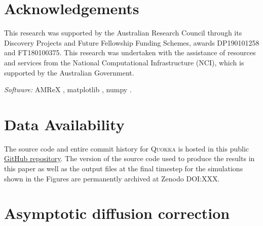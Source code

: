 \documentclass[fleqn,usenatbib]{mnras}
\begin{document}
\section*{Acknowledgements}

This research was supported by the Australian Research Council through its Discovery Projects and Future Fellowship Funding Schemes, awards DP190101258 and FT180100375. This research was undertaken with the assistance of resources and services from the National Computational Infrastructure (NCI), which is supported by the Australian Government.

\emph{Software:} AMReX \citep{the_amrex_development_team_2021_5363443},
matplotlib \citep{Hunter:2007},
numpy \citep{harris2020array}.

\section*{Data Availability}
The source code and entire commit history for \textsc{Quokka} is hosted in this public \faGithub\href{https://github.com/BenWibking/quokka-code}{GitHub repository}. The version of the source code used to produce the results in this paper as well as the output files at the final timestep for the simulations shown in the Figures are permanently archived at Zenodo DOI:XXX.







\appendix
\section{Asymptotic diffusion correction}
\label{appendix:asymptotic_correction}



\bsp	%
\label{lastpage}
\end{document}
